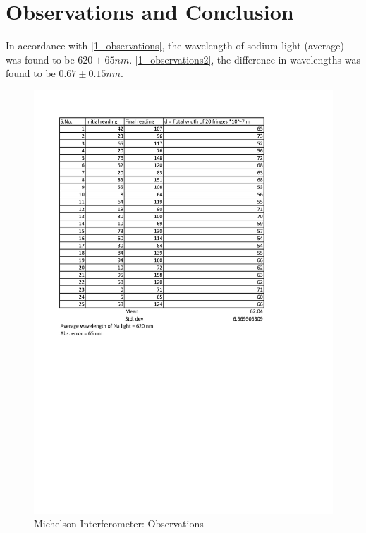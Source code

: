 \section{Observations and Conclusion}
	In accordance with \autoref{1_observations}, the wavelength of sodium light (average) was found to be $620 \pm 65nm$. \autoref{1_observations2}, the difference in wavelengths was found to be $0.67 \pm 0.15 nm$.
	\begin{figure}[bth]
		\begin{center}
			\includegraphics[width=1.3\linewidth]{gfx/1_obsA}
		\end{center}
		\caption[Observations for $\lambda_\text{average}0$]{Michelson Interferometer: Observations}
	\label{1_observations}
	\end{figure}
